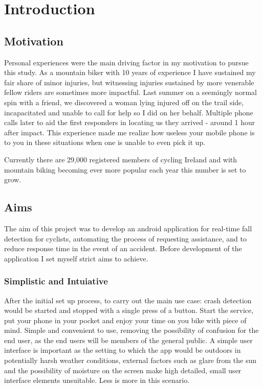 \chapter{Introduction}

\section{Motivation }

Personal experiences were the main driving factor in my motivation to pursue this study. As a mountain biker with 10 years of experience I have sustained my fair share of minor injuries, but witnessing injuries sustained by more venerable fellow riders are sometimes more impactful. Last summer on a seemingly normal spin with a friend, we discovered a woman lying injured off on the trail side, incapacitated and unable to call for help so I did on her behalf. Multiple phone calls later to aid the first responders in locating us they arrived - around 1 hour after impact.  This experience made me realize how useless your mobile phone is to you in these situations when one is unable to even pick it up.

Currently there are 29,000 registered members of cycling Ireland and with mountain biking  becoming ever more popular each year this number is set to grow. 


\section{Aims}


The  aim of this project was to develop an android application for real-time fall detection for cyclists,  automating the process of requesting assistance, and to reduce response time in the event of an accident. Before development of the application I set myself strict aims to achieve. 

\subsection*{Simplistic and Intuiative}
After the initial set up process, to carry out the main use case: crash detection would be started and stopped with a single press of a button. Start the service, put your phone in your pocket and enjoy your time on you bike with piece of mind. Simple and convenient to use, removing the possibility of confusion for the end user, as the end users will be members of  the general public.
A simple user interface is important as the setting to which the app would be outdoors in potentially harsh weather conditions, external factors such as glare from the sun  and the possibility of moisture on the screen make high detailed, small user interface elements unsuitable. Less is more in this scenario.

